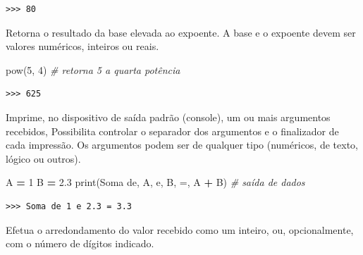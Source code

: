 \documentclass[
]{book}
\newenvironment{Shaded}{\begin{snugshade}}{\end{snugshade}}
\newcommand{\BuiltInTok}[1]{#1}
\newcommand{\CommentTok}[1]{\textcolor[rgb]{0.56,0.35,0.01}{\textit{#1}}}
\newcommand{\DecValTok}[1]{\textcolor[rgb]{0.00,0.00,0.81}{#1}}
\newcommand{\FloatTok}[1]{\textcolor[rgb]{0.00,0.00,0.81}{#1}}
\newcommand{\NormalTok}[1]{#1}
\newcommand{\OperatorTok}[1]{\textcolor[rgb]{0.81,0.36,0.00}{\textbf{#1}}}
\newcommand{\StringTok}[1]{\textcolor[rgb]{0.31,0.60,0.02}{#1}}
\providecommand{\tightlist}{%
  \setlength{\itemsep}{0pt}\setlength{\parskip}{0pt}}
\begin{document}
\begin{verbatim}
>>> 80
\end{verbatim}

\begin{description}
\tightlist
\item[\texttt{pow(base,\ exp)}]
Retorna o resultado da base elevada ao expoente. A base e o expoente devem ser valores numéricos, inteiros ou reais.
\end{description}

\begin{Shaded}
\begin{Highlighting}[]
\BuiltInTok{pow}\NormalTok{(}\DecValTok{5}\NormalTok{, }\DecValTok{4}\NormalTok{) }\CommentTok{\# retorna 5 a quarta potência}
\end{Highlighting}
\end{Shaded}

\begin{verbatim}
>>> 625
\end{verbatim}

\begin{description}
\tightlist
\item[\texttt{print(*argumento)}]
Imprime, no dispositivo de saída padrão (console), um ou mais argumentos recebidos, Possibilita controlar o separador dos argumentos e o finalizador de cada impressão. Os argumentos podem ser de qualquer tipo (numéricos, de texto, lógico ou outros).
\end{description}

\begin{Shaded}
\begin{Highlighting}[]
\NormalTok{A }\OperatorTok{=} \DecValTok{1}
\NormalTok{B }\OperatorTok{=} \FloatTok{2.3}
\BuiltInTok{print}\NormalTok{(}\StringTok{\textquotesingle{}Soma de\textquotesingle{}}\NormalTok{, A, }\StringTok{\textquotesingle{}e\textquotesingle{}}\NormalTok{, B, }\StringTok{\textquotesingle{}=\textquotesingle{}}\NormalTok{, A }\OperatorTok{+}\NormalTok{ B) }\CommentTok{\# saída de dados}
\end{Highlighting}
\end{Shaded}

\begin{verbatim}
>>> Soma de 1 e 2.3 = 3.3
\end{verbatim}

\begin{description}
\tightlist
\item[\texttt{round(x,\ {[}digitos{]})}]
Efetua o arredondamento do valor recebido como um inteiro, ou, opcionalmente, com o número de dígitos indicado.
\end{description}
\end{document}
